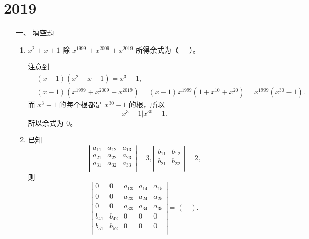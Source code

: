 \section{2019}
\begin{enumerate}[1~]
\renewcommand{\labelenumi}{\textbf{\theenumi. }}
\renewcommand{\Im}{\text{Im }}
\item[一、]填空题 
\begin{enumerate}[1.~]
\item
$x^2+x+1$ 除 $x^{1999}+x^{2009}+x^{2019}$ 所得余式为（\ \ \ ）。
\begin{solution}
注意到
\begin{align*}
&(x-1)(x^2+x+1)=x^3-1,\\
&(x-1)(x^{1999}+x^{2009}+x^{2019})=(x-1)x^{1999}(1+x^{10}+x^{20})=x^{1999}(x^{30}-1).
\end{align*}
而 $x^3-1$ 的每个根都是 $x^{30}-1$ 的根，所以
\[
x^3-1|x^{30}-1.
\]
所以余式为 $0$。
\end{solution}

\item
已知
$$
\left| \begin{matrix}
	a_{11}&		a_{12}&		a_{13}\\
	a_{21}&		a_{22}&		a_{23}\\
	a_{31}&		a_{32}&		a_{33}\\
\end{matrix} \right|=3,
\left| \begin{matrix}
	b_{11}&		b_{12}\\
	b_{21}&		b_{22}\\
\end{matrix} \right|=2
,
$$
则 
$$
\left| \begin{matrix}
	0&		0&		a_{13}&		a_{14}&		a_{15}\\
	0&		0&		a_{23}&		a_{24}&		a_{25}\\
	0&		0&		a_{33}&		a_{34}&		a_{35}\\
	b_{41}&		b_{42}&		0&		0&		0\\
	b_{51}&		b_{52}&		0&		0&		0\\
\end{matrix} \right|=(\quad).
$$


\end{enumerate}
\end{enumerate}
